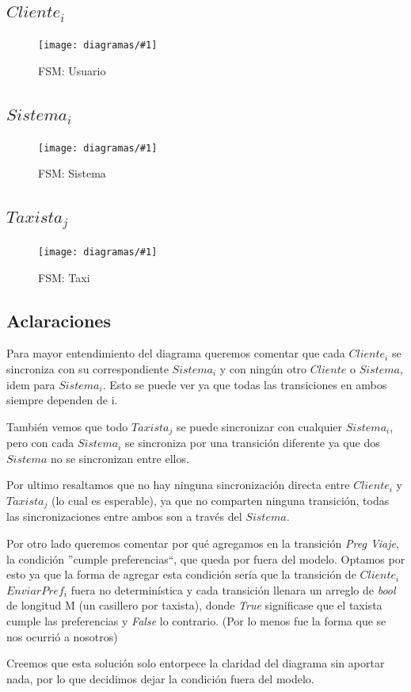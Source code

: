 \documentclass[a4paper, 10pt, twoside]{article}
\newcommand{\diagramavfig}[2]{%
  \begin{figure}[H]
    \texttt{[image: diagramas/\#1]}%
    \caption{#2}
    \label{fig:#1}
  \end{figure}
}
\begin{document}
\subsection{$Cliente_i$}
\label{sec:fsm-usuario}
\diagramavfig{fsm-usuario}{FSM: Usuario}

\subsection{$Sistema_i$}
\label{sec:fsm-sistema}
\diagramavfig{fsm-sistema}{FSM: Sistema}

\subsection{$Taxista_j$}
\label{sec:fsm-taxi}
\diagramavfig{fsm-taxi}{FSM: Taxi}

\subsection{Aclaraciones}

Para mayor entendimiento del diagrama queremos comentar que cada $Cliente_i$ se sincroniza con su correspondiente $Sistema_i$ y con ning\'un otro $Cliente$ o $Sistema$, idem para $Sistema_i$. Esto se puede ver ya que todas las transiciones en ambos siempre dependen de i.

Tambi\'en vemos que todo $Taxista_j$ se puede sincronizar con cualquier $Sistema_i$, pero con cada $Sistema_i$ se sincroniza por una transici\'on diferente ya que dos $Sistema$ no se sincronizan entre ellos.

Por ultimo resaltamos que no hay ninguna sincronizaci\'on directa entre $Cliente_i$ y $Taxista_j$ (lo cual es esperable), ya que no comparten ninguna transici\'on, todas las sincronizaciones entre ambos son a través del $Sistema$.

Por otro lado queremos comentar por qué agregamos en la transici\'on \emph{Preg Viaje}, la condici\'on ''cumple preferencias``, que queda por fuera del modelo. Optamos por esto ya que la forma de agregar esta condici\'on ser\'ia que la transici\'on de $Cliente_i$ $EnviarPref_i$ fuera no determin\'istica y cada transici\'on llenara un arreglo de \emph{bool} de longitud M (un casillero por taxista), donde \emph{True} significase que el taxista cumple las preferencias y \emph{False} lo contrario. (Por lo menos fue la forma que se nos ocurri\'o a nosotros) 

Creemos que esta soluci\'on solo entorpece la claridad del diagrama sin aportar nada, por lo que decidimos dejar la condici\'on fuera del modelo.
\end{document}
